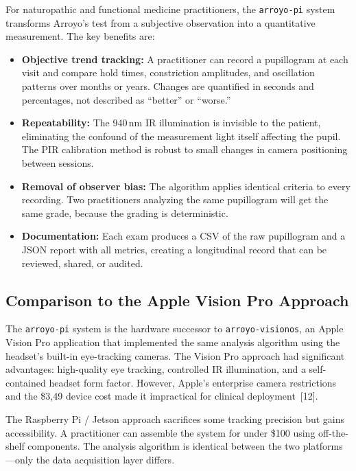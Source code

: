 \documentclass[11pt]{article}
\begin{document}
For naturopathic and functional medicine practitioners, the \texttt{arroyo-pi}
system transforms Arroyo's test from a subjective observation into a
quantitative measurement. The key benefits are:

\begin{itemize}
  \item \textbf{Objective trend tracking:} A practitioner can record a
        pupillogram at each visit and compare hold times, constriction
        amplitudes, and oscillation patterns over months or years. Changes
        are quantified in seconds and percentages, not described as
        ``better'' or ``worse.''
  \item \textbf{Repeatability:} The 940\,nm IR illumination is invisible to
        the patient, eliminating the confound of the measurement light
        itself affecting the pupil. The PIR calibration method is robust to
        small changes in camera positioning between sessions.
  \item \textbf{Removal of observer bias:} The algorithm applies identical
        criteria to every recording. Two practitioners analyzing the same
        pupillogram will get the same grade, because the grading is
        deterministic.
  \item \textbf{Documentation:} Each exam produces a CSV of the raw
        pupillogram and a JSON report with all metrics, creating a
        longitudinal record that can be reviewed, shared, or audited.
\end{itemize}

\subsection{Comparison to the Apple Vision Pro Approach}

The \texttt{arroyo-pi} system is the hardware successor to
\texttt{arroyo-visionos}, an Apple Vision Pro application that implemented
the same analysis algorithm using the headset's built-in eye-tracking
cameras. The Vision Pro approach had significant advantages: high-quality
eye tracking, controlled IR illumination, and a self-contained headset form
factor. However, Apple's enterprise camera restrictions and the \$3,49
device cost made it impractical for clinical deployment~[12].

The Raspberry Pi / Jetson approach sacrifices some tracking precision but
gains accessibility. A practitioner can assemble the system for under \$100
using off-the-shelf components. The analysis algorithm is identical between
the two platforms---only the data acquisition layer differs.
\end{document}
